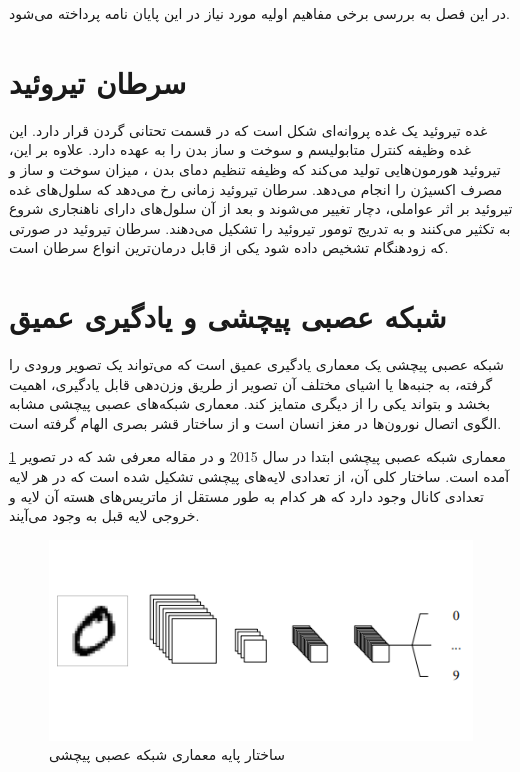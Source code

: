 در این فصل به بررسی برخی مفاهیم اولیه مورد نیاز در این پایان نامه پرداخته می‌شود.

\section{سرطان تیروئید}\label{sec:سرطان-تیروئید}
غده تیروئید یک غده پروانه‌ای شکل است که در قسمت تحتانی گردن قرار دارد.
این غده وظیفه کنترل متابولیسم و سوخت و ساز بدن را به عهده دارد.
علاوه بر این، تیروئید هورمون‌هایی تولید می‌کند که وظیفه تنظیم دمای بدن ، میزان سوخت و ساز و مصرف اکسیژن را انجام می‌دهد.
سرطان تیروئید زمانی رخ می‌دهد که سلول‌های غده تیروئید بر اثر عواملی، دچار تغییر می‌شوند و بعد از آن سلول‌های دارای ناهنجاری شروع به تکثیر می‌کنند و به تدریج تومور تیروئید را تشکیل می‌دهند.
سرطان تیروئید در صورتی که زودهنگام تشخیص داده شود یکی از قابل درمان‌ترین انواع سرطان است.







\section{شبکه عصبی پیچشی و یادگیری عمیق}\label{sec:شبکه عصبی پیچشی و یادگیری عمیق}
شبکه عصبی پیچشی یک معماری یادگیری عمیق است که می‌تواند یک تصویر ورودی را گرفته، به جنبه‌ها یا اشیای مختلف آن تصویر از طریق وزن‌دهی قابل یادگیری، اهمیت بخشد و بتواند یکی را از دیگری متمایز کند. معماری شبکه‌های عصبی پیچشی مشابه الگوی اتصال نورون‌ها در مغز انسان است و از ساختار قشر بصری الهام گرفته است.

معماری شبکه عصبی پیچشی ابتدا در سال 2015 و در مقاله \cite{o2015introduction} معرفی شد که در تصویر \ref{fig:cnnarchitecture} آمده است. ساختار کلی آن، از تعدادی لایه‌های پیچشی تشکیل شده است که در هر لایه تعدادی کانال وجود دارد که هر کدام به طور مستقل از ماتریس‌های هسته آن لایه و خروجی لایه قبل به وجود می‌آیند.
\begin{figure}
    \begin{center}
        \includegraphics[width=0.8\linewidth]{figs/basic_concepts/subs/cnn_image_processing/basic_cnn_arhitecture.PNG}
    \end{center}
    \caption{ساختار پایه معماری شبکه عصبی پیچشی}
    \label{fig:cnnarchitecture}
\end{figure}

